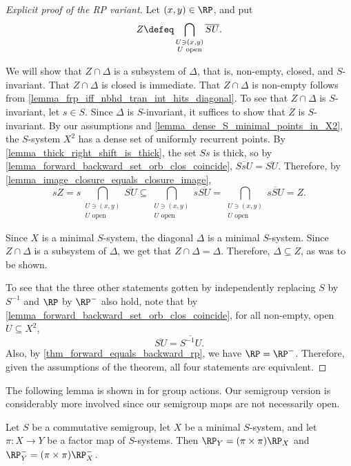 \begin{proof}[Explicit proof of the RP variant]
    Let $(x,y) \in \RP$, and put
    \[Z \defeq \bigcap_{\substack{U \ni (x,y) \\ U \text{ open}}} \overline{S U}.\]
    
    We will show that $Z \cap \Delta$ is a subsystem of $\Delta$, that is, non-empty, closed, and $S$-invariant. That $Z \cap \Delta$ is closed is immediate. That $Z \cap \Delta$ is non-empty follows from \cref{lemma_frp_iff_nbhd_tran_int_hits_diagonal}.
    To see that $Z \cap \Delta$ is $S$-invariant, let $s \in S$.  Since $\Delta$ is $S$-invariant, it suffices to show that $Z$ is $S$-invariant. By our assumptions and \cref{lemma_dense_S_minimal_points_in_X2}, the $S$-system $X^2$ has a dense set of uniformly recurrent points.  By \cref{lemma_thick_right_shift_is_thick}, the set $Ss$ is thick, so by \cref{lemma_forward_backward_set_orb_clos_coincide}, $\overline{SsU} = \overline{SU}$. Therefore, by \cref{lemma_image_closure_equals_closure_image},
    \[
        sZ = s\bigcap_{\substack{U \ni (x,y) \\ U \text{ open}}} \overline{S U} \subseteq \bigcap_{\substack{U \ni (x,y) \\ U \text{ open}}} s \overline{S U} = \bigcap_{\substack{U \ni (x,y) \\ U \text{ open}}} \overline{sS U} = Z.
    \]

    Since $X$ is a minimal $S$-system, the diagonal $\Delta$ is a minimal $S$-system. Since $Z \cap \Delta$ is a subsystem of $\Delta$, we get that $Z \cap \Delta = \Delta$. Therefore, $\Delta \subseteq Z$, as was to be shown.

    To see that the three other statements gotten by independently replacing $S$ by $S^{-1}$ and $\RP$ by $\RP^-$ also hold, note that by \cref{lemma_forward_backward_set_orb_clos_coincide}, for all non-empty, open $U \subseteq X^2$,
    \[\overline{S U} = \overline{S^{-1}U}.\]
    Also, by \cref{thm_forward_equals_backward_rp}, we have $\RP = \RP^-$.  Therefore, given the assumptions of the theorem, all four statements are equivalent.
\end{proof}


The following lemma is shown in \cite[V. 2.12 and 2.14, pg. 416]{devries_book_1993} for group actions.  Our semigroup version is considerably more involved since our semigroup maps are not necessarily open.

\begin{theorem}
    \label{lemma_frp_functorial_property_minimal}
    \label{lemma_rp_functorial_property_minimal}
    Let $S$ be a commutative semigroup, let $X$ be a minimal $S$-system, and let $\pi: X \to Y$ be a factor map of $S$-systems.  Then $\RP_Y = (\pi \times \pi) \RP_X$ and $\RP^-_Y = (\pi \times \pi) \RP^-_X$.
\end{theorem}

